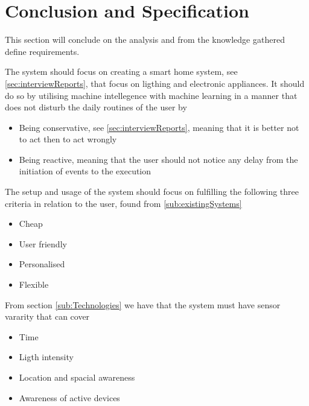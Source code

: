 \section{Conclusion and Specification}
This section will conclude on the analysis and from the knowledge gathered define requirements.

The system should focus on creating a smart home system, see \cref{sec:interviewReports}, that focus on ligthing and electronic appliances. It should do so by utilising machine intellegence with machine learning in a manner that does not disturb the daily routines of the user by
\begin{itemize}
  \item Being conservative, see \cref{sec:interviewReports}, meaning that it is better not to act then to act wrongly
  \item Being reactive, meaning that the user should not notice any delay from the initiation of events to the execution
\end{itemize}

The setup and usage of the system should focus on fulfilling the following three criteria in relation to the user, found from \cref{sub:existingSystems}
\begin{itemize}
  \item Cheap
  \item User friendly
  \item Personalised
  \item Flexible
\end{itemize}

From section \cref{sub:Technologies} we have that the system must have sensor vararity that can cover
\begin{itemize}
  \item Time
  \item Ligth intensity
  \item Location and spacial awareness
  \item Awareness of active devices
\end{itemize}